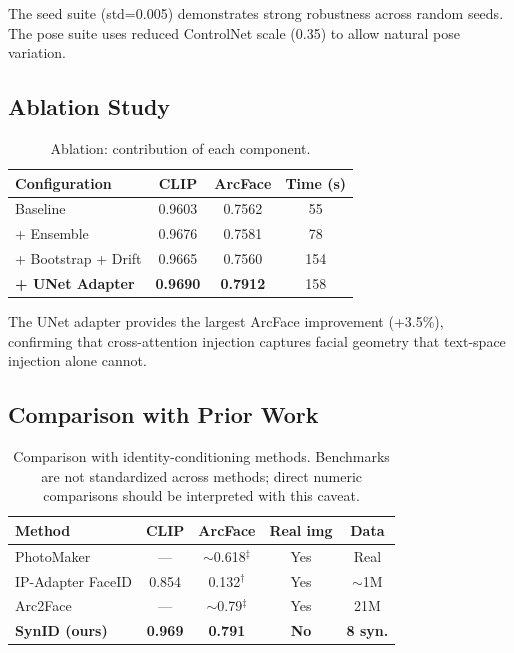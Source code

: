 \documentclass[10pt,twocolumn]{article}
\begin{document}
The seed suite (std=0.005) demonstrates strong robustness across random seeds. The pose suite uses reduced ControlNet scale (0.35) to allow natural pose variation.

\subsection{Ablation Study}

\begin{table}[h]
\centering
\caption{Ablation: contribution of each component.}
\label{tab:ablation}
\begin{tabular}{lccc}
\toprule
Configuration & CLIP & ArcFace & Time (s) \\
\midrule
Baseline & 0.9603 & 0.7562 & 55 \\
+ Ensemble & 0.9676 & 0.7581 & 78 \\
+ Bootstrap + Drift & 0.9665 & 0.7560 & 154 \\
\textbf{+ UNet Adapter} & \textbf{0.9690} & \textbf{0.7912} & 158 \\
\bottomrule
\end{tabular}
\end{table}

The UNet adapter provides the largest ArcFace improvement (+3.5\%), confirming that cross-attention injection captures facial geometry that text-space injection alone cannot.

\subsection{Comparison with Prior Work}

\begin{table}[h]
\centering
\caption{Comparison with identity-conditioning methods. Benchmarks are not standardized across methods; direct numeric comparisons should be interpreted with this caveat.}
\label{tab:comparison}
\begin{tabular}{lcccc}
\toprule
Method & CLIP & ArcFace & Real img & Data \\
\midrule
PhotoMaker~\cite{li2024photomaker} & --- & $\sim$0.618$^\ddagger$ & Yes & Real \\
IP-Adapter FaceID & 0.854 & 0.132$^\dagger$ & Yes & $\sim$1M \\
Arc2Face~\cite{papantoniou2024arc2face} & --- & $\sim$0.79$^\ddagger$ & Yes & 21M \\
\textbf{SynID (ours)} & \textbf{0.969} & \textbf{0.791} & \textbf{No} & \textbf{8 syn.} \\
\bottomrule
\end{tabular}
\end{table}
\end{document}

